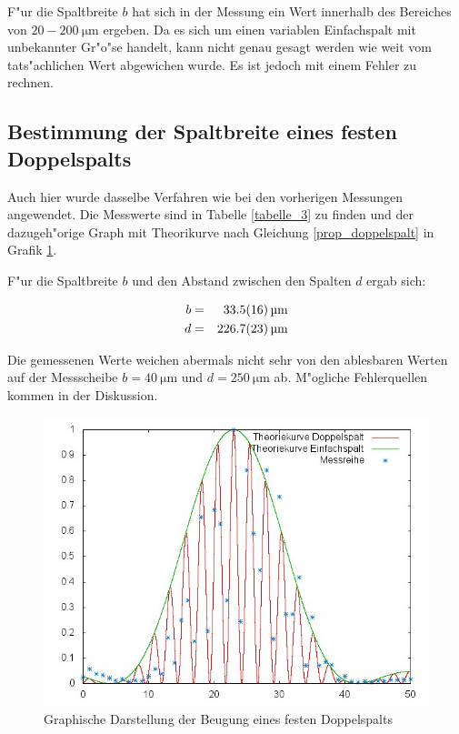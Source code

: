 		F"ur die Spaltbreite $b$ hat sich in der Messung ein Wert innerhalb des Bereiches von $20-200 \SI{}{\micro \meter}$ ergeben. Da es sich um einen variablen Einfachspalt mit unbekannter Gr"o"se handelt, kann nicht genau gesagt werden wie weit vom tats"achlichen Wert abgewichen wurde. Es ist jedoch mit einem Fehler zu rechnen.

\clearpage
		\newpage
		\newpage
	\subsection{Bestimmung der Spaltbreite eines festen Doppelspalts} 
	\label{sub:bestimmung_der_spaltbreite_eines_festen_doppelspalts}
	
		Auch hier wurde dasselbe Verfahren wie bei den vorherigen Messungen angewendet.
		Die Messwerte sind in Tabelle \ref{tabelle_3} zu finden und der dazugeh"orige Graph mit Theorikurve nach Gleichung \ref{prop_doppelspalt} in Grafik \ref{graph3}.

		F"ur die Spaltbreite $b$ und den Abstand zwischen den Spalten $d$ ergab sich:

		\begin{eqnarray*}
			b &=& \SI{33.5 (16)}{\micro \meter}\\
			d &=& \SI{226.7 (23)}{\micro \meter}
		\end{eqnarray*}

		Die gemessenen Werte weichen abermals nicht sehr von den ablesbaren Werten auf der Messscheibe $b = \SI{40}{\micro \meter}$ und $d = \SI{250}{\micro \meter}$ ab.
		M"ogliche Fehlerquellen kommen in der Diskussion.

		

		\begin{figure}[H]
			\centering
			\includegraphics[width = 14cm]{graph3.jpg}
			\caption{Graphische Darstellung der Beugung eines festen Doppelspalts}
			\label{graph3}
		\end{figure}
		\clearpage
